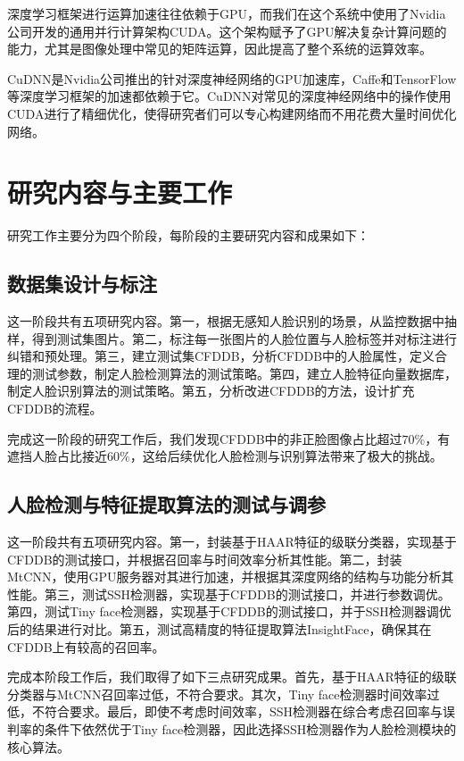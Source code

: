 深度学习框架进行运算加速往往依赖于GPU，而我们在这个系统中使用了Nvidia公司开发的通用并行计算架构CUDA\cite{nickolls2008scalable}。这个架构赋予了GPU解决复杂计算问题的能力，尤其是图像处理中常见的矩阵运算，因此提高了整个系统的运算效率。

CuDNN\cite{chetlur2014cudnn}是Nvidia公司推出的针对深度神经网络的GPU加速库，Caffe和TensorFlow等深度学习框架的加速都依赖于它。CuDNN对常见的深度神经网络中的操作使用CUDA进行了精细优化，使得研究者们可以专心构建网络而不用花费大量时间优化网络。

\section{研究内容与主要工作}

研究工作主要分为四个阶段，每阶段的主要研究内容和成果如下：

\subsection{数据集设计与标注}

这一阶段共有五项研究内容。第一，根据无感知人脸识别的场景，从监控数据中抽样，得到测试集图片。第二，标注每一张图片的人脸位置与人脸标签并对标注进行纠错和预处理。第三，建立测试集CFDDB，分析CFDDB中的人脸属性，定义合理的测试参数，制定人脸检测算法的测试策略。第四，建立人脸特征向量数据库，制定人脸识别算法的测试策略。第五，分析改进CFDDB的方法，设计扩充CFDDB的流程。

完成这一阶段的研究工作后，我们发现CFDDB中的非正脸图像占比超过$70\%$，有遮挡人脸占比接近$60\%$，这给后续优化人脸检测与识别算法带来了极大的挑战。

\subsection{人脸检测与特征提取算法的测试与调参}

这一阶段共有五项研究内容。第一，封装基于HAAR特征的级联分类器\cite{viola2004robust}，实现基于CFDDB的测试接口，并根据召回率与时间效率分析其性能。第二，封装MtCNN\cite{zhang2016joint}，使用GPU服务器对其进行加速，并根据其深度网络的结构与功能分析其性能。第三，测试SSH检测器\cite{najibi2017ssh}，实现基于CFDDB的测试接口，并进行参数调优。第四，测试Tiny face检测器\cite{hu2017finding}，实现基于CFDDB的测试接口，并于SSH检测器调优后的结果进行对比。第五，测试高精度的特征提取算法InsightFace\cite{deng2018arcface}，确保其在CFDDB上有较高的召回率。

完成本阶段工作后，我们取得了如下三点研究成果。首先，基于HAAR特征的级联分类器与MtCNN召回率过低，不符合要求。其次，Tiny face检测器时间效率过低，不符合要求。最后，即使不考虑时间效率，SSH检测器在综合考虑召回率与误判率的条件下依然优于Tiny face检测器，因此选择SSH检测器作为人脸检测模块的核心算法。

